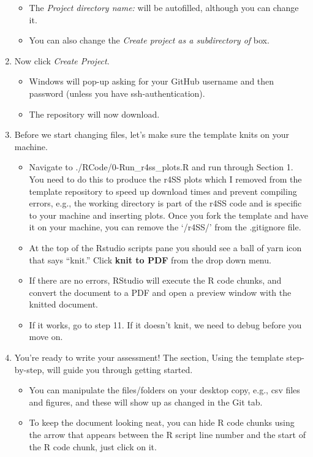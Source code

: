 \documentclass[12pt,]{article}
\providecommand{\tightlist}{%
  \setlength{\itemsep}{0pt}\setlength{\parskip}{0pt}}
\begin{document}
\begin{enumerate}
  \begin{itemize}
  \tightlist
  \item
    The \emph{Project directory name:} will be autofilled, although you
    can change it.
  \item
    You can also change the \emph{Create project as a subdirectory of}
    box.
  \end{itemize}
\item
  Now click \emph{Create Project}.

  \begin{itemize}
  \tightlist
  \item
    Windows will pop-up asking for your GitHub username and then
    password (unless you have ssh-authentication).
  \item
    The repository will now download.
  \end{itemize}
\item
  Before we start changing files, let's make sure the template knits on
  your machine.

  \begin{itemize}
  \tightlist
  \item
    Navigate to ./RCode/0-Run\_r4ss\_plots.R and run through Section 1.
    You need to do this to produce the r4SS plots which I removed from
    the template repository to speed up download times and prevent
    compiling errors, e.g., the working directory is part of the r4SS
    code and is specific to your machine and inserting plots. Once you
    fork the template and have it on your machine, you can remove the
    `/r4SS/' from the .gitignore file.
  \item
    At the top of the Rstudio scripts pane you should see a ball of yarn
    icon that says ``knit.'' Click \textbf{knit to PDF} from the drop
    down menu.
  \item
    If there are no errors, RStudio will execute the R code chunks, and
    convert the document to a PDF and open a preview window with the
    knitted document.
  \item
    If it works, go to step 11. If it doesn't knit, we need to debug
    before you move on.
  \end{itemize}
\item
  You're ready to write your assessment! The section, Using the template
  step-by-step, will guide you through getting started.

  \begin{itemize}
  \tightlist
  \item
    You can manipulate the files/folders on your desktop copy, e.g., csv
    files and figures, and these will show up as changed in the Git tab.
  \item
    To keep the document looking neat, you can hide R code chunks using
    the arrow that appears between the R script line number and the
    start of the R code chunk, just click on it.
  \end{itemize}
\end{enumerate}
\end{document}
